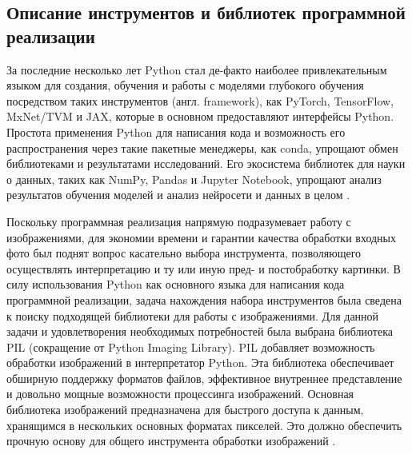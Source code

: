 \documentclass[bachelor, och, coursework]{SCWorks}
\begin{document}
    \subsection{Описание инструментов и библиотек программной реализации}

        За последние несколько лет Python стал де-факто наиболее привлекательным
        языком для создания, обучения и работы с моделями глубокого обучения
        посредством таких инструментов (англ. framework), как PyTorch,
        TensorFlow, MxNet/TVM и JAX, которые в основном предоставляют интерфейсы
        Python. Простота применения Python для написания кода и возможность его
        распространения через такие пакетные менеджеры, как conda, упрощают
        обмен библиотеками и результатами исследований. Его экосистема библиотек
        для науки о данных, таких как NumPy, Pandas и Jupyter Notebook, упрощают
        анализ результатов обучения моделей и анализ нейросети и данных в целом
        \cite{python}.

        Поскольку программная реализация напрямую подразумевает работу с
        изображениями, для экономии времени и гарантии качества обработки
        входных фото был поднят вопрос касательно выбора инструмента,
        позволяющего осуществлять интерпретацию и ту или иную пред- и
        постобработку картинки. В силу использования Python как основного языка
        для написания кода программной реализации, задача нахождения набора
        инструментов была сведена к поиску подходящей библиотеки для работы с
        изображениями. Для данной задачи и удовлетворения необходимых
        потребностей была выбрана библиотека PIL (сокращение от Python Imaging
        Library). PIL добавляет возможность обработки изображений в
        интерпретатор Python. Эта библиотека обеспечивает обширную поддержку
        форматов файлов, эффективное внутреннее представление и довольно мощные
        возможности процессинга изображений. Основная библиотека изображений
        предназначена для быстрого доступа к данным, хранящимся в нескольких
        основных форматах пикселей. Это должно обеспечить прочную основу для
        общего инструмента обработки изображений \cite{pil}.
\end{document}
